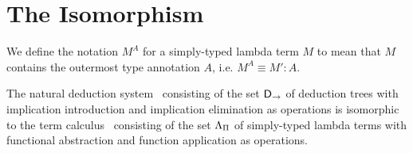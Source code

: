 \section{The Isomorphism}
\label{section:bijection}

\begin{definition}
We define the notation $M^{A}$ for a simply-typed lambda term $M$ to mean that
$M$ contains the outermost type annotation $A$, i.e. $M^A \equiv M':A$.
\end{definition}

\begin{theorem}
The natural deduction system \implnpi\ consisting of the set $\mathsf{D}_\to$ of
deduction trees with implication introduction and implication elimination as
operations is isomorphic to the term calculus \stlambda\ consisting of the set
$\Lambda_\Pi$ of simply-typed lambda terms with functional abstraction and
function application as operations.
\end{theorem}

